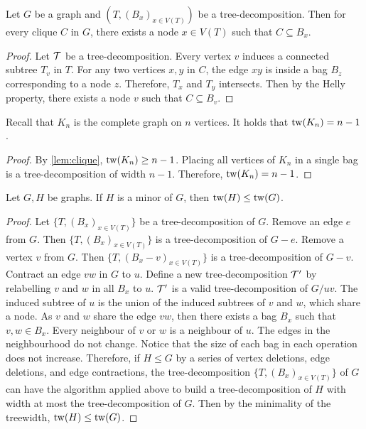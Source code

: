 \begin{proposition}\label{lem:clique}
	Let $G$ be a graph and $(T, (B_x)_{x \in V(T)})$ be a tree-decomposition. Then for every clique \(C\) in \(G\), there exists a node \(x \in V(T)\) such that \(C \subseteq B_x\).
\end{proposition}

\begin{proof}
	Let \(\mathcal{T}\) be a tree-decomposition. Every vertex \(v\) induces a connected subtree \(T_v\) in \(T\). For any two vertices \(x, y\) in \(C\), the edge \(xy\) is inside a bag \(B_z\) corresponding to a node \(z\). Therefore, \(T_x\) and \(T_y\) intersects. Then by the Helly property, there exists a node \(v\) such that \(C \subseteq B_v\).
\end{proof}

\begin{corollary}\label{cor:complete_tw}
	Recall that $K_n$ is the complete graph on $n$ vertices. It holds that \(\operatorname{tw}(K_n) = n-1\).
\end{corollary}
\begin{proof}
	By \cref{lem:clique}, $\operatorname{tw}(K_n)\geq n-1$. Placing all vertices of $K_n$ in a single bag is a tree-decomposition of width $n-1$. Therefore, $\operatorname{tw}(K_n) = n-1$. 
\end{proof}

\begin{proposition}\label{thm:tw_minor_closure}
	Let $G, H$ be graphs. If \(H\) is a minor of \(G\), then \(\operatorname{tw}(H) \leq \operatorname{tw}(G)\).
\end{proposition}
\begin{proof}
	Let \( \{T, {(B_x)}_{x \in V(T)} \} \) be a tree-decomposition of \(G\). Remove an edge $e$ from $G$. Then \( \{T, {(B_x)}_{x \in V(T)} \} \) is a tree-decomposition of $G - e$. Remove a vertex $v$ from $G$. Then \( \{ T, {(B_x - v)}_{x \in V(T)} \} \) is a tree-decomposition of $G - v$. Contract an edge $vw$ in $G$ to $u$. Define a new tree-decomposition $\mathcal{T}'$ by relabelling \(v\) and \(w\) in all $B_x$ to \(u\). $\mathcal{T}'$ is a valid tree-decomposition of $G / uv$. The induced subtree of \(u\) is the union of the induced subtrees of \(v\) and \(w\), which share a node. As $v$ and $w$ share the edge $vw$, then there exists a bag $B_x$ such that $v, w \in B_x$. Every neighbour of \(v\) or \(w\) is a neighbour of \(u\). The edges in the neighbourhood do not change. Notice that the size of each bag in each operation does not increase. Therefore, if $H \leq G$ by a series of vertex deletions, edge deletions, and edge contractions, the tree-decomposition \( \{T, {(B_x)}_{x \in V(T)} \} \) of $G$ can have the algorithm applied above to build a tree-decomposition of $H$ with width at most the tree-decomposition of $G$. Then by the minimality of the treewidth, \(\operatorname{tw}(H) \leq \operatorname{tw}(G)\). 
\end{proof}

